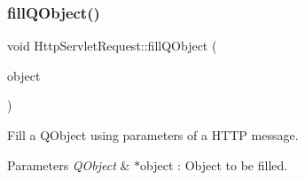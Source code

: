 \subsubsection{\texorpdfstring{fill\+Q\+Object()}{fillQObject()}}
{\footnotesize\ttfamily void Http\+Servlet\+Request\+::fill\+Q\+Object (\begin{DoxyParamCaption}\item[{Q\+Object $\ast$}]{object }\end{DoxyParamCaption})}



Fill a Q\+Object using parameters of a H\+T\+TP message. 


\begin{DoxyParams}{Parameters}
{\em Q\+Object} & $\ast$object \+: Object to be filled. \\
\hline
\end{DoxyParams}
